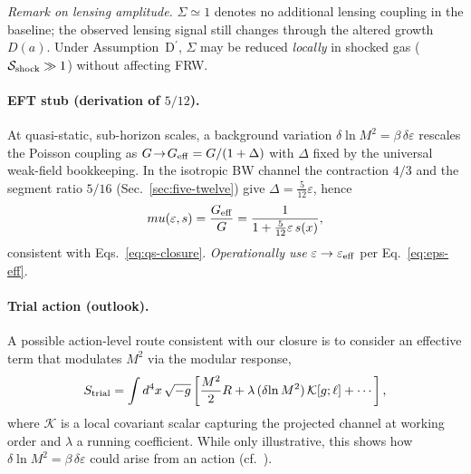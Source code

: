 \documentclass[aps,prd,onecolumn,superscriptaddress,nofootinbib]{revtex4-2}
\def\mu{mu}%
\providecommand{\be}{\begin{equation}}
\providecommand{\ee}{\end{equation}}
\begin{document}
\noindent\emph{Remark on lensing amplitude.} \(\Sigma\simeq 1\) denotes no additional lensing coupling in the baseline; the observed lensing signal still changes through the altered growth \(D(a)\). Under Assumption~D\(^{\prime}\), \(\Sigma\) may be reduced \emph{locally} in shocked gas (\(\mathcal S_{\rm shock}\gg 1\)) without affecting FRW.

\paragraph{EFT stub (derivation of \(5/12\)).}
At quasi-static, sub-horizon scales, a background variation \(\delta\ln M^2=\beta\,\delta\varepsilon\) rescales the Poisson coupling as \(G\!\to\!G_{\rm eff}=G/(1+\Delta)\) with \(\Delta\) fixed by the universal weak-field bookkeeping. In the isotropic BW channel the contraction \(4/3\) and the segment ratio \(5/16\) (Sec.~\ref{sec:five-twelve}) give \(\Delta=\tfrac{5}{12}\varepsilon\), hence
\be
\mu(\varepsilon,s)=\frac{G_{\rm eff}}{G}=\frac{1}{1+\tfrac{5}{12}\varepsilon\,s(x)},
\label{eq:eft-stub}
\ee
consistent with Eqs.~\eqref{eq:qs-closure}. \emph{Operationally use} \(\varepsilon\to\varepsilon_{\rm eff}\) per Eq.~\eqref{eq:eps-eff}.

\paragraph{Trial action (outlook).}
A possible action-level route consistent with our closure is to consider an effective term that modulates \(M^2\) via the modular response,
\[
S_{\rm trial}=\int d^4x \,\sqrt{-g}\left[\frac{M^2}{2}R + \lambda\,(\delta\!\ln M^2)\,\mathcal{K}[g;\ell] + \cdots\right],
\]
where \(\mathcal K\) is a local covariant scalar capturing the projected channel at working order and \(\lambda\) a running coefficient. While only illustrative, this shows how \(\delta\!\ln M^2=\beta\,\delta\varepsilon\) could arise from an action (cf.\ \cite{Jacobson2016,Lashkari2014}).
\end{document}
